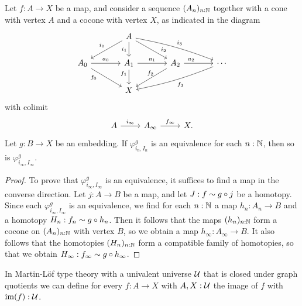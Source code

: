\begin{lem}\label{lem:factor_seq}
Let $f:A\to X$ be a map, and consider a sequence $(A_n)_{n:\mathbb{N}}$ together with
a cone with vertex $A$ and a cocone with vertex $X$, as indicated in the
diagram 
\begin{equation*}
\begin{tikzcd}[column sep=large]
& A \arrow[dl,swap,"i_0"] \arrow[d,swap,"i_1"] \arrow[dr,"i_2" near end] \arrow[drr,bend left=5,"i_3"] \\
A_0 \arrow[dr,swap,near start,"f_0"] \arrow[r,"a_{0}"] & A_1 \arrow[d,swap,near start,"f_1"] \arrow[r,"a_1"] & A_2 \arrow[dl,swap,"f_2" xshift=.5em] \arrow[r,"a_2" near start] & \cdots \arrow[dll,bend left=5,"f_3"] \\
& X
\end{tikzcd}
\end{equation*}
with colimit
\begin{equation*}
\begin{tikzcd}
A \arrow[r,"i_\infty"] & A_\infty \arrow[r,"f_\infty"] & X.
\end{tikzcd}
\end{equation*}
Let $g:B\to X$ be an embedding. If $\varphi^g_{i_n,I_n}$ is an equivalence for each $n:\mathbb{N}$, then so is $\varphi^g_{i_\infty,I_\infty}$. 
\end{lem}

\begin{proof}
To prove that $\varphi^g_{i_\infty,I_\infty}$ is an equivalence, it suffices to
find a map in the converse direction. Let $j:A\to B$ be a map, and let
$J:f\sim g\circ j$ be a homotopy. Since each $\varphi^g_{i_\infty,I_\infty}$
is an equivalence, we find for each $n:\mathbb{N}$ a map
$h_n:A_n\to B$ and a homotopy $H_n: f_n\sim g\circ h_n$. Then it follows that
the maps $(h_n)_{n:\mathbb{N}}$ form a cocone on $(A_n)_{n:\mathbb{N}}$ with vertex $B$, so
we obtain a map $h_\infty:A_\infty\to B$. It also follows that the homotopies
$(H_n)_{n:\mathbb{N}}$ form a compatible family of homotopies, so that we obtain
$H_\infty:f_\infty\sim g\circ h_\infty$.
\end{proof}

\begin{thm}\label{thm:image}
In Martin-L\"of type theory with a univalent universe $\mathcal{U}$ that is closed under
graph quotients we can define for every $f:A\to X$ with $A,X:\mathcal{U}$ the image
of $f$ with $\operatorname{im}(f):\mathcal{U}$.
\end{thm}

